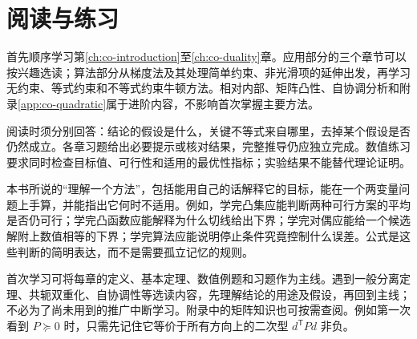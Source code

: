 \section*{阅读与练习}

首先顺序学习第\ref{ch:co-introduction}至\ref{ch:co-duality}章。应用部分的三个章节可以按兴趣选读；算法部分从梯度法及其处理简单约束、非光滑项的延伸出发，再学习无约束、等式约束和不等式约束牛顿方法。相对内部、矩阵凸性、自协调分析和附录\ref{app:co-quadratic}属于进阶内容，不影响首次掌握主要方法。

阅读时须分别回答：结论的假设是什么，关键不等式来自哪里，去掉某个假设是否仍然成立。各章习题给出必要提示或核对结果，完整推导仍应独立完成。数值练习要求同时检查目标值、可行性和适用的最优性指标；实验结果不能替代理论证明。

本书所说的“理解一个方法”，包括能用自己的话解释它的目标，能在一个两变量问题上手算，并能指出它何时不适用。例如，学完凸集应能判断两种可行方案的平均是否仍可行；学完凸函数应能解释为什么切线给出下界；学完对偶应能给一个候选解附上数值相等的下界；学完算法应能说明停止条件究竟控制什么误差。公式是这些判断的简明表达，而不是需要孤立记忆的规则。

首次学习可将每章的定义、基本定理、数值例题和习题作为主线。遇到一般分离定理、共轭双重化、自协调性等选读内容，先理解结论的用途及假设，再回到主线；不必为了尚未用到的推广中断学习。附录中的矩阵知识也可按需查阅。例如第一次看到 $P\succeq0$ 时，只需先记住它等价于所有方向上的二次型 $d^{\mathsf T}Pd$ 非负。

